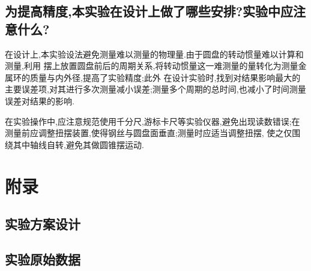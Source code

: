 \documentclass[12pt,a4paper,oneside]{ctexart}
\begin{document}
\subsection{为提高精度,本实验在设计上做了哪些安排?实验中应注意什么?}
在设计上,本实验设法避免测量难以测量的物理量.由于圆盘的转动惯量难以计算和测量,利用
摆上放置圆盘前后的周期关系,将转动惯量这一难测量的量转化为测量金属环的质量与内外径,提高了实验精度;此外
在设计实验时,找到对结果影响最大的主要误差项,对其进行多次测量减小误差;测量多个周期的总时间,也减小了时间测量误差对结果的影响.
\par
在实验操作中,应注意规范使用千分尺,游标卡尺等实验仪器,避免出现读数错误;在测量前应调整扭摆装置,使得钢丝与圆盘面垂直;测量时应适当调整扭摆,
使之仅围绕其中轴线自转,避免其做圆锥摆运动.
\newpage
\section{附录}
\subsection{实验方案设计}
\subsection{实验原始数据}
\end{document}
